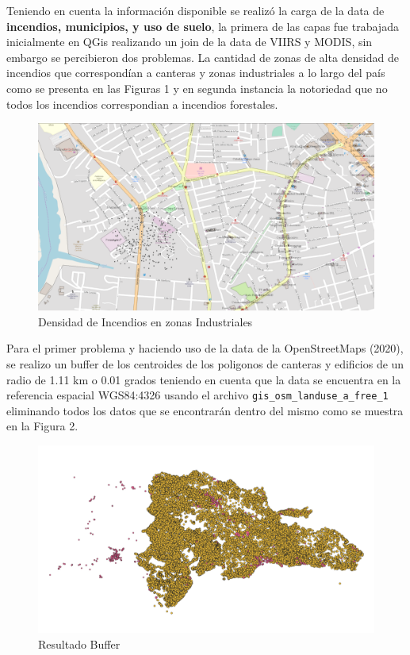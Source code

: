 \documentclass[11pt,]{article}
\begin{document}
Teniendo en cuenta la información disponible se realizó la carga de la
data de \textbf{incendios, municipios, y uso de suelo}, la primera de
las capas fue trabajada inicialmente en QGis realizando un join de la
data de VIIRS y MODIS, sin embargo se percibieron dos problemas. La
cantidad de zonas de alta densidad de incendios que correspondían a
canteras y zonas industriales a lo largo del país como se presenta en
las Figuras 1 y en segunda instancia la notoriedad que no todos los
incendios correspondian a incendios forestales.

\begin{figure}
\centering
\includegraphics{proyecto_files/Imagenes/BuildingPoints.png}
\caption{Densidad de Incendios en zonas Industriales}
\end{figure}

Para el primer problema y haciendo uso de la data de la OpenStreetMaps
(2020), se realizo un buffer de los centroides de los poligonos de
canteras y edificios de un radio de 1.11 km o 0.01 grados teniendo en
cuenta que la data se encuentra en la referencia espacial WGS84:4326
usando el archivo \texttt{gis\_osm\_landuse\_a\_free\_1} eliminando
todos los datos que se encontrarán dentro del mismo como se muestra en
la Figura 2.

\begin{figure}
\centering
\includegraphics{proyecto_files/Imagenes/Buffer.png}
\caption{Resultado Buffer}
\end{figure}
\end{document}
